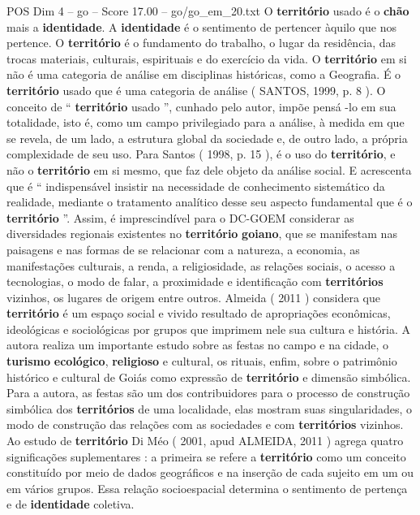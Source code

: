 \begin{textsample}{POS Dim 4 – go – Score 17.00 – go/go\_em\_20.txt}
O \textbf{território} usado é o \textbf{chão} mais a \textbf{identidade}.
A \textbf{identidade} é o sentimento de pertencer àquilo que nos pertence.
O \textbf{território} é o fundamento do trabalho, o lugar da residência, das trocas materiais, culturais, espirituais e do exercício da vida.
O \textbf{território} em si não é uma categoria de análise em disciplinas históricas, como a Geografia.
É o \textbf{território} usado que é uma categoria de análise ( SANTOS, 1999, p. 8 ).
O conceito de “ \textbf{território} usado ”, cunhado pelo autor, impõe pensá -lo em sua totalidade, isto é, como um campo privilegiado para a análise, à medida em que se revela, de um lado, a estrutura global da sociedade e, de outro lado, a própria complexidade de seu uso.
Para Santos ( 1998, p. 15 ), é o uso do \textbf{território}, e não o \textbf{território} em si mesmo, que faz dele objeto da análise social.
E acrescenta que é “ indispensável insistir na necessidade de conhecimento sistemático da realidade, mediante o tratamento analítico desse seu aspecto fundamental que é o \textbf{território} ”.
Assim, é imprescindível para o DC-GOEM considerar as diversidades regionais existentes no \textbf{território} \textbf{goiano}, que se manifestam nas paisagens e nas formas de se relacionar com a natureza, a economia, as manifestações culturais, a renda, a religiosidade, as relações sociais, o acesso a tecnologias, o modo de falar, a proximidade e identificação com \textbf{territórios} vizinhos, os lugares de origem entre outros.
Almeida ( 2011 ) considera que \textbf{território} é um espaço social e vivido resultado de apropriações econômicas, ideológicas e sociológicas por grupos que imprimem nele sua cultura e história.
A autora realiza um importante estudo sobre as festas no campo e na cidade, o \textbf{turismo} \textbf{ecológico}, \textbf{religioso} e cultural, os rituais, enfim, sobre o patrimônio histórico e cultural de Goiás como expressão de \textbf{território} e dimensão simbólica.
Para a autora, as festas são um dos contribuidores para o processo de construção simbólica dos \textbf{territórios} de uma localidade, elas mostram suas singularidades, o modo de construção das relações com as sociedades e com \textbf{territórios} vizinhos.
Ao estudo de \textbf{território} Di Méo ( 2001, apud ALMEIDA, 2011 ) agrega quatro significações suplementares : a primeira se refere a \textbf{território} como um conceito constituído por meio de dados geográficos e na inserção de cada sujeito em um ou em vários grupos.
Essa relação socioespacial determina o sentimento de pertença e de \textbf{identidade} coletiva.

\end{textsample}
